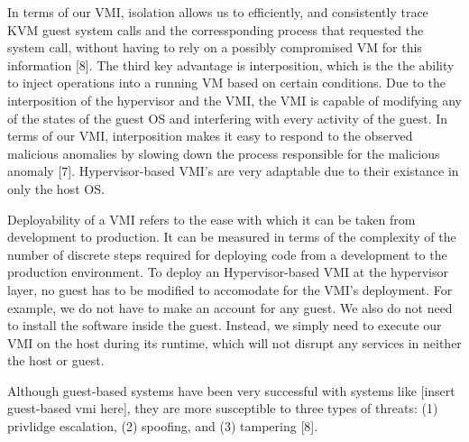 \documentclass{report}
\begin{document}
\begin{spacing}{1.5}
{\large
In terms of our VMI, isolation allows us to efficiently, and consistently trace KVM guest system calls and the corressponding process that requested the system call, without having to rely on a possibly compromised VM for this information [8]. The third key advantage is interposition, which is the the ability to inject operations into a running VM based on certain conditions. Due to the interposition of the hypervisor and the VMI, the VMI is capable of modifying any of the states of the guest OS and interfering with every activity of the guest. In terms of our VMI, interposition makes it easy to respond to the observed malicious anomalies by slowing down the process responsible for the malicious anomaly [7]. Hypervisor-based VMI's are very adaptable due to their existance in only the host OS. 
\newline
}


{\large
Deployability of a VMI refers to the ease with which it can be taken from development to production. It can be measured in terms of the complexity of the number of discrete steps required for deploying code from a development to the production environment. To deploy an Hypervisor-based VMI at the hypervisor layer, no guest has to be modified to accomodate for the VMI's deployment. For example, we do not have to make an account for any guest. We also do not need to install the software inside the guest. Instead, we simply need to execute our VMI on the host during its runtime, which will not disrupt any services in neither the host or guest.
\newline
}


{\large
Although guest-based systems have been very successful with systems like [insert guest-based vmi here], they are more susceptible to three types of threats: (1) privlidge escalation, (2) spoofing, and (3) tampering [8]. 
\newline
}


\end{spacing}
\end{document}
